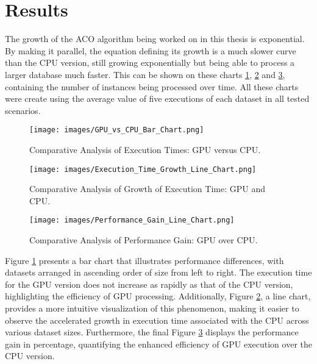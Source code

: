\section{Results} \label{Results}

The growth of the ACO algorithm being worked on in this thesis is exponential.
By making it parallel, the equation defining its growth is a much slower curve than the CPU version,
still growing exponentially but being able to process a larger database much faster.
This can be shown on these charts \ref{fig:gpu_vs_cpu}, \ref{fig:execution_time_growth} and
\ref{fig:performance_gain}, containing the number of instances being processed over time. All these charts
were create using the average value of five executions of each dataset in all tested scenarios.

\begin{figure}[h!]
    \centering
    \texttt{[image: images/GPU\_vs\_CPU\_Bar\_Chart.png]}
    \caption{Comparative Analysis of Execution Times: GPU versus CPU.}
    \label{fig:gpu_vs_cpu}
\end{figure}

\begin{figure}[h!]
    \centering
    \texttt{[image: images/Execution\_Time\_Growth\_Line\_Chart.png]}
    \caption{Comparative Analysis of Growth of Execution Time: GPU and CPU.}
    \label{fig:execution_time_growth}
\end{figure}

\begin{figure}[h!]
    \centering
    \texttt{[image: images/Performance\_Gain\_Line\_Chart.png]}
    \caption{Comparative Analysis of Performance Gain: GPU over CPU.}
    \label{fig:performance_gain}
\end{figure}

Figure \ref{fig:gpu_vs_cpu} presents a bar chart that illustrates performance differences, with datasets arranged in ascending order of size from left to right. The execution time for the GPU version does not increase as rapidly as that of the CPU version, highlighting the efficiency of GPU processing. Additionally, Figure \ref{fig:execution_time_growth}, a line chart, provides a more intuitive visualization of this phenomenon, making it easier to observe the accelerated growth in execution time associated with the CPU across various dataset sizes. Furthermore, the final Figure \ref{fig:performance_gain} displays the performance gain in percentage, quantifying the enhanced efficiency of GPU execution over the CPU version.

